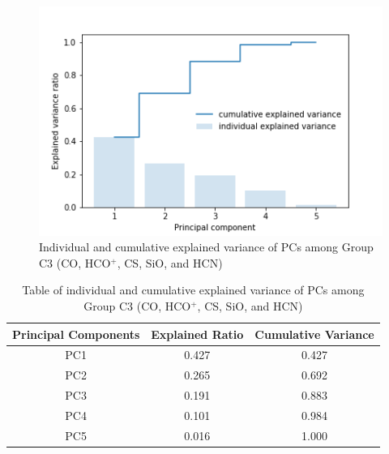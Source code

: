 \documentclass{aa}
\begin{document}
\begin{CJK*}{UTF8}{gbsn}
    \begin{figure}[htbp]
       \centering
       \captionsetup{justification=centering}
       \includegraphics[angle=0,scale = 0.6]{5/explained_variance_ratio.png}
       \caption{Individual and cumulative explained variance of PCs among Group C3 (CO, HCO$^+$, CS, SiO, and HCN)}
             \label{Fig-5-variance}
    \end{figure}
   
    \begin{table}[htbp]
        \centering
        \begin{tabular}{ccc}
        \hline\hline
        \multicolumn{1}{l}{Principal Components} & \multicolumn{1}{l}{Explained Ratio} & Cumulative Variance \\ \hline
                PC1 & 0.427  & 0.427\\ 
                PC2 & 0.265  & 0.692\\
                PC3 & 0.191  & 0.883\\
                PC4 & 0.101  & 0.984\\ 
                PC5 & 0.016  & 1.000\\ \hline\hline
        \end{tabular}
        \caption{Table of individual and cumulative explained variance of PCs among Group C3 (CO, HCO$^+$, CS, SiO, and HCN)}
        \label{table-5-variance}
    \end{table}



\end{CJK*}
\end{document}
